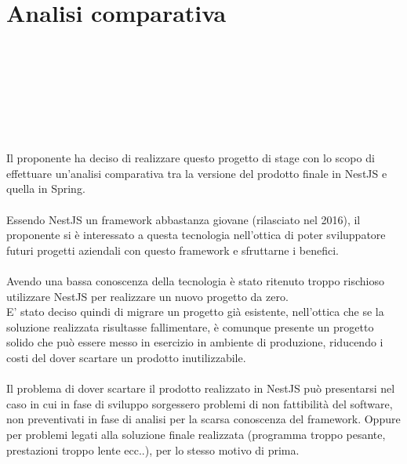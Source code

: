
\chapter{Analisi comparativa}
\label{cap:analisi-comparativa}

\\\\\\\\\\\\\\
Il proponente ha deciso di realizzare questo progetto di stage con lo scopo di effettuare 
un'analisi comparativa tra la versione del prodotto finale in NestJS e quella in Spring.
\\\\
Essendo NestJS un framework abbastanza giovane (rilasciato nel 2016), il proponente si 
è interessato a questa tecnologia nell'ottica di poter sviluppatore futuri progetti 
aziendali con questo framework e sfruttarne i benefici.
\\\\
Avendo una bassa conoscenza della tecnologia è stato ritenuto troppo rischioso utilizzare NestJS per 
realizzare un nuovo progetto da zero. 
\\
E' stato deciso quindi di migrare un progetto già esistente, nell'ottica che se la soluzione
realizzata risultasse fallimentare, è comunque presente un progetto solido che può essere
messo in esercizio in ambiente di produzione, riducendo i costi del dover scartare un prodotto 
inutilizzabile.
\\\\
Il problema di dover scartare il prodotto realizzato in NestJS può presentarsi nel caso in cui in fase di sviluppo
sorgessero problemi di non fattibilità del software, non preventivati in fase di analisi per la
scarsa conoscenza del framework. Oppure per problemi legati alla soluzione finale realizzata (programma troppo pesante, prestazioni troppo lente ecc..), per lo 
stesso motivo di prima.

